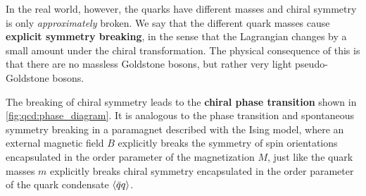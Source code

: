 In the real world, however, the quarks have different masses and chiral symmetry is only \emph{approximately} broken.
We say that the different quark masses cause \textbf{explicit symmetry breaking}, in the sense that the Lagrangian changes by a small amount under the chiral transformation.
The physical consequence of this is that there are no massless Goldstone bosons, but rather very light pseudo-Goldstone bosons.

The breaking of chiral symmetry leads to the \textbf{chiral phase transition} shown in \cref{fig:qcd:phase_diagram}.
It is analogous to the phase transition and spontaneous symmetry breaking in a paramagnet described with the Ising model,
where an external magnetic field $B$ explicitly breaks the symmetry of spin orientations encapsulated in the order parameter of the magnetization $M$,
just like the quark masses $m$ explicitly breaks chiral symmetry encapsulated in the order parameter of the quark condensate $\langle \bar{q} q \rangle$.
